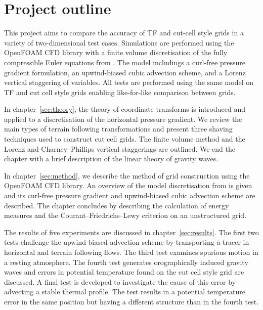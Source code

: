 

\section{Project outline}
This project aims to compare the accuracy of TF and cut-cell style grids in a variety of two-dimensional test cases.   Simulations are performed using the OpenFOAM CFD library \autocite{openfoam} with a finite volume discretisation of the fully compressible Euler equations from \textcite{weller-shahrokhi2014}.  The model includings a curl-free pressure gradient formulation, an upwind-biased cubic advection scheme, and a Lorenz vertical staggering of variables.  All tests are performed using the same model on TF and cut cell style grids enabling like-for-like comparison between grids.

In chapter~\ref{sec:theory}, the theory of coordinate transforms is introduced and applied to a discretisation of the horizontal pressure gradient.  We review the main types of terrain following transformations and present three shaving techniques used to construct cut cell grids.  The finite volume method and the Lorenz and Charney--Phillips vertical staggerings are outlined.  We end the chapter with a brief description of the linear theory of gravity waves.

In chapter~\ref{sec:method}, we describe the method of grid construction using the OpenFOAM CFD library.  An overview of the model discretisation from \textcite{weller-shahrokhi2014} is given and its curl-free pressure gradient and upwind-biased cubic advection scheme are described.  The chapter concludes by describing the calculation of energy measures and the Courant--Friedrichs--Lewy criterion on an unstructured grid.

The results of five experiments are discussed in chapter~\ref{sec:results}.  The first two tests challenge the upwind-biased advection scheme by transporting a tracer in horizontal and terrain following flows.  The third test examines spurious motion in a resting atmosphere.  The fourth test generates orographically induced gravity waves and errors in potential temperature found on the cut cell style grid are discussed.  A final test is developed to investigate the cause of this error by advecting a stable thermal profile.  The test results in a potential temperature error in the same position but having a different structure than in the fourth test.

